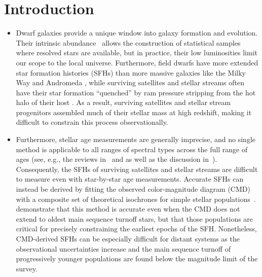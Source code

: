 \documentclass[ms.tex]{subfiles}
\begin{document}
\section{Introduction}
\label{sec:intro}

\begin{itemize}

	\item Dwarf galaxies provide a unique window into galaxy formation and
	evolution.
	Their intrinsic abundance~\citep{Bell2003, Baldry2012} allows the
	construction of statistical samples where resolved stars are available, but
	in practice, their low luminosities limit our scope to the local universe.
	Furthermore, field dwarfs have more extended star formation histories (SFHs)
	than more massive galaxies like the Milky Way and Andromeda
	\citep[e.g.][]{Behroozi2019}, while surviving satellites and stellar
	streams often have their star formation ``quenched'' by ram pressure
	stripping from the hot halo of their host
	\citep*[see discussion in, e.g.,][]{Steyrleithner2020}.
	As a result, surviving satellites and stellar stream progenitors assembled
	much of their stellar mass at high redshift, making it difficult to
	constrain this process observationally.

	\item Furthermore, stellar age measurements are generally imprecise, and no
	single method is applicable to all ranges of spectral types across the full
	range of ages (see, e.g., the reviews in~\citealp{Soderblom2010} and
	\citealp{Chaplin2013} as well as the discussion in~\citealp{Angus2019}).
	Consequently, the SFHs of surviving satellites and stellar streams are
	difficult to measure even with star-by-star age measurements.
	Accurate SFHs can instead be derived by fitting the observed
	color-magnitude diagram (CMD) with a composite set of theoretical
	isochrones for simple stellar populations~\citep[e.g.][]{Dolphin2002}.
	\citet{Weisz2014} demonstrate that this method is accurate even when the
	CMD does not extend to oldest main sequence turnoff stars, but that those
	populations are critical for precisely constraining the earliest epochs of
	the SFH.
	Nonetheless, CMD-derived SFHs can be especially difficult for distant
	systems as the observational uncertainties increase and the main sequence
	turnoff of progressively younger populations are found below the magnitude
	limit of the survey.


\end{itemize}
\end{document}
